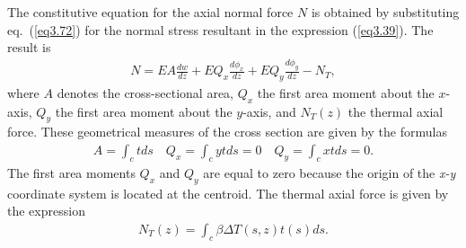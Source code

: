\documentclass{AeroStructure-ERJohnson}
\begin{document}
The constitutive equation for the axial normal force $N$ is obtained by substituting eq.~(\ref{eq3.72}) for the normal stress resultant in the expression (\ref{eq3.39}). The result is
\begin{align}\label{eq3.73}
N=E A \frac{d w}{d z}+E Q_{x} \frac{d \phi_{x}}{d z}+E Q_{y} \frac{d \phi_{y}}{d z}-N_{T},
\end{align}
where $A$ denotes the cross-sectional area, $Q_{x}$ the first area moment about the $x$-axis, $Q_{y}$ the first area moment about the $y$-axis, and $N_{T}(z)$ the thermal axial force. These geometrical measures of the cross section are given by the formulas
\begin{align}\label{eq3.74}
A=\int_{c} t d s \quad Q_{x}=\int_{c} y t d s=0 \quad Q_{y}=\int_{c} x t d s=0.
\end{align}
The first area moments $Q_x$ and $Q_{y}$ are equal to zero because the origin of the \textit{x-y }coordinate system is located at the centroid. The thermal axial force is given by the expression
\begin{align}\label{eq3.75}
N_{T}(z)=\int_{c} \beta \Delta T(s, z) t(s) d s.
\end{align}

\removelastskip
\end{document}
